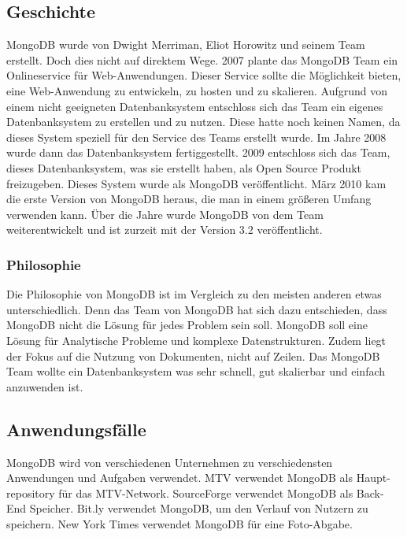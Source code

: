 \subsection{Geschichte}
MongoDB wurde von Dwight Merriman, Eliot Horowitz und seinem Team erstellt. Doch dies nicht auf direktem Wege. 2007 plante das MongoDB Team ein Onlineservice für Web-Anwendungen. Dieser Service sollte die Möglichkeit bieten, eine Web-Anwendung zu entwickeln, zu hosten und zu skalieren. Aufgrund von einem nicht geeigneten Datenbanksystem entschloss sich das Team ein eigenes Datenbanksystem zu erstellen und zu nutzen. Diese hatte noch keinen Namen, da dieses System speziell für den Service des Teams erstellt wurde. Im Jahre 2008 wurde dann das Datenbanksystem fertiggestellt. 2009 entschloss sich das Team, dieses Datenbanksystem, was sie erstellt haben, als Open Source Produkt freizugeben. Dieses System wurde als MongoDB veröffentlicht. März 2010 kam die erste Version von MongoDB heraus, die man in einem größeren Umfang verwenden kann. Über die Jahre wurde MongoDB von dem Team weiterentwickelt und ist zurzeit mit der Version 3.2 veröffentlicht. 
\subsubsection{Philosophie}
Die Philosophie von MongoDB ist im Vergleich zu den meisten anderen etwas unterschiedlich. Denn das Team von MongoDB hat sich dazu entschieden, dass MongoDB nicht die Lösung für jedes Problem sein soll. MongoDB soll eine Lösung für Analytische Probleme und komplexe Datenstrukturen. Zudem liegt der Fokus auf die Nutzung von Dokumenten, nicht auf Zeilen. Das MongoDB Team wollte ein Datenbanksystem was sehr schnell, gut skalierbar und einfach anzuwenden ist.
\subsection{Anwendungsfälle}
MongoDB wird von verschiedenen Unternehmen zu verschiedensten Anwendungen und Aufgaben verwendet.
MTV verwendet MongoDB als Haupt-repository für das MTV-Network.
SourceForge verwendet MongoDB als Back-End Speicher.
Bit.ly verwendet MongoDB, um den Verlauf von Nutzern zu speichern.
New York Times verwendet MongoDB  für eine Foto-Abgabe.
